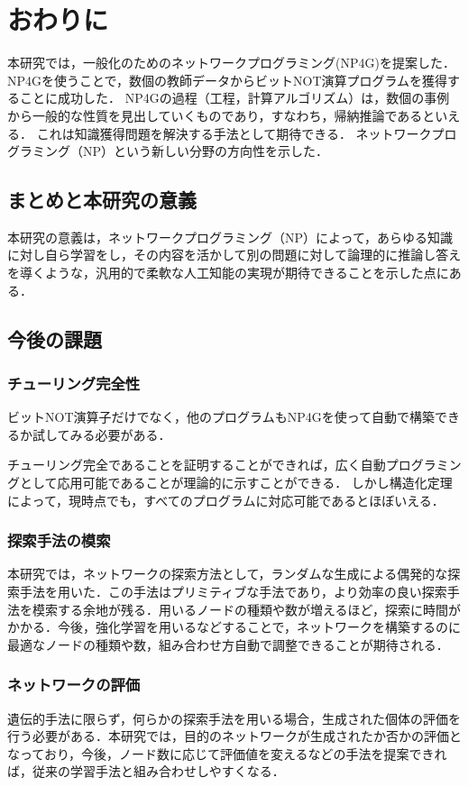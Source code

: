 \documentclass[exploratorypaper]{jsaiart} %
\begin{document}
\section{おわりに}
本研究では，一般化のためのネットワークプログラミング(NP4G)を提案した．NP4Gを使うことで，数個の教師データからビットNOT演算プログラムを獲得することに成功した．
NP4Gの過程（工程，計算アルゴリズム）は，数個の事例から一般的な性質を見出していくものであり，すなわち，帰納推論であるといえる．
これは知識獲得問題を解決する手法として期待できる．
ネットワークプログラミング（NP）という新しい分野の方向性を示した．
\subsection{まとめと本研究の意義}
本研究の意義は，ネットワークプログラミング（NP）によって，あらゆる知識に対し自ら学習をし，その内容を活かして別の問題に対して論理的に推論し答えを導くような，汎用的で柔軟な人工知能の実現が期待できることを示した点にある．
\subsection{今後の課題}
\subsubsection{チューリング完全性}

ビットNOT演算子だけでなく，他のプログラムもNP4Gを使って自動で構築できるか試してみる必要がある．

チューリング完全であることを証明することができれば，広く自動プログラミングとして応用可能であることが理論的に示すことができる．
しかし構造化定理によって，現時点でも，すべてのプログラムに対応可能であるとほぼいえる．
\subsubsection{探索手法の模索}
本研究では，ネットワークの探索方法として，ランダムな生成による偶発的な探索手法を用いた．この手法はプリミティブな手法であり，より効率の良い探索手法を模索する余地が残る．用いるノードの種類や数が増えるほど，探索に時間がかかる．今後，強化学習を用いるなどすることで，ネットワークを構築するのに最適なノードの種類や数，組み合わせ方自動で調整できることが期待される．
\subsubsection{ネットワークの評価}
遺伝的手法に限らず，何らかの探索手法を用いる場合，生成された個体の評価を行う必要がある．本研究では，目的のネットワークが生成されたか否かの評価となっており，今後，ノード数に応じて評価値を変えるなどの手法を提案できれば，従来の学習手法と組み合わせしやすくなる．
\end{document}
